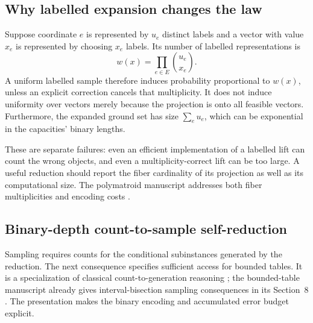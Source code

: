 \documentclass[11pt]{article}
\begin{document}
\subsection{Why labelled expansion changes the law}
Suppose coordinate \(e\) is represented by \(u_e\) distinct labels and a vector with value \(x_e\) is represented by choosing \(x_e\) labels. Its number of labelled representations is
\[
 w(x)=\prod_{e\in E}\binom{u_e}{x_e}.
\]
A uniform labelled sample therefore induces probability proportional to \(w(x)\), unless an explicit correction cancels that multiplicity. It does not induce uniformity over vectors merely because the projection is onto all feasible vectors. Furthermore, the expanded ground set has size \(\sum_eu_e\), which can be exponential in the capacities' binary lengths.

These are separate failures: even an efficient implementation of a labelled lift can count the wrong objects, and even a multiplicity-correct lift can be too large. A useful reduction should report the fiber cardinality of its projection as well as its computational size. The polymatroid manuscript addresses both fiber multiplicities and encoding costs \cite{oaiPolymatroids}.


\subsection{Binary-depth count-to-sample self-reduction}
Sampling requires counts for the conditional subinstances generated by the reduction. The next consequence specifies sufficient access for bounded tables. It is a specialization of classical count-to-generation reasoning \cite{JVV1986}; the bounded-table manuscript already gives interval-bisection sampling consequences in its Section~8 \cite{oaiBoundedTables}. The presentation makes the binary encoding and accumulated error budget explicit.
\end{document}

